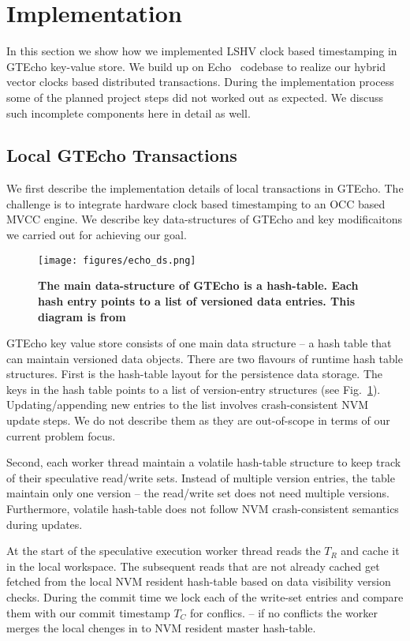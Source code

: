 
\section{Implementation}
In this section we show how we implemented LSHV clock based timestamping in GTEcho key-value store.
We build up on Echo~\cite{echo} codebase to realize our hybrid vector clocks based distributed transactions.
During the implementation process some of the planned project steps did not worked out as expected. 
We discuss such incomplete components here in detail as well.


\subsection{Local GTEcho Transactions}

We first describe the implementation details of local transactions in GTEcho. 
The challenge is to integrate hardware clock based timestamping to an OCC based
MVCC engine. We describe key data-structures of GTEcho and key modificaitons we 
carried out for achieving our goal.

\begin{figure}[]   
	\centering
	\texttt{[image: figures/echo\_ds.png]} 
	\caption{\bf The main data-structure of GTEcho is a hash-table. 
	Each hash entry points to a list of versioned data entries. This diagram is from ~\cite{echo}} 
	\label{fig:echods} 
\end{figure}

GTEcho key value store consists of one main data structure -- a hash table that can maintain versioned data objects. 
There are two flavours of runtime hash table structures. First is the hash-table layout for the 
persistence data storage. The keys in the hash table points to a list of version-entry structures
(see Fig.~\ref{fig:echods}).
Updating/appending new entries to the list involves crash-consistent NVM update steps. We do not describe them as they
are out-of-scope in terms of our current problem focus.

Second, each worker thread maintain a volatile hash-table structure to keep track of their speculative read/write sets.
Instead of multiple version entries, the table maintain only one version -- the read/write set does not need multiple versions.
Furthermore, volatile hash-table does not follow NVM crash-consistent semantics during updates.

At the start of the speculative execution worker thread reads the $T_R$ and cache it in the local workspace. The subsequent
reads that are not already cached get fetched from the local NVM resident hash-table based on data visibility version checks.
During the commit time we lock each of the write-set entries and 
compare them with  our commit timestamp $T_C$ for 
conflics. -- if no conflicts the worker merges the local chenges in to NVM resident master hash-table. 

